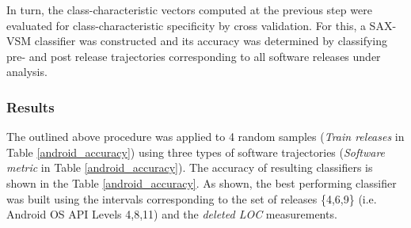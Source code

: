 \begin{table}[t]
\centering
{}
\end{table}

In turn, the class-characteristic vectors computed at the previous step were evaluated for class-characteristic specificity by cross validation. For this, a SAX-VSM classifier was constructed and its accuracy was determined by classifying pre- and post release trajectories corresponding to all software releases under analysis.

\subsubsection{Results}
The outlined above procedure was applied to 4 random samples (\textit{Train releases} in Table  \ref{android_accuracy}) using three types of software trajectories (\textit{Software metric} in Table  \ref{android_accuracy}). The accuracy of resulting classifiers is shown in the Table  \ref{android_accuracy}. As shown, the best performing classifier was built using the intervals corresponding to the set of releases \{4,6,9\} (i.e. Android OS API Levels 4,8,11) and the \textit{deleted LOC} measurements.

